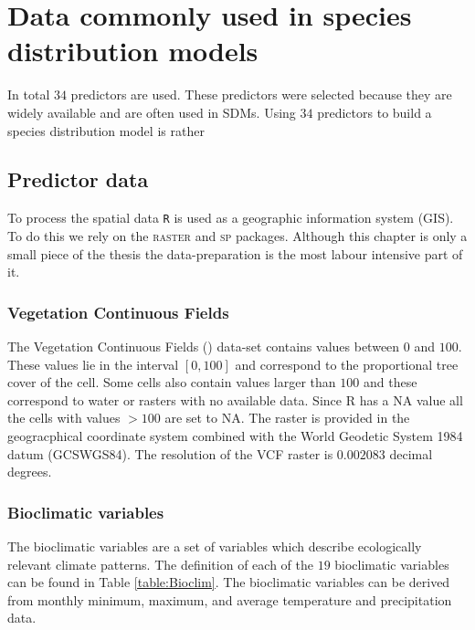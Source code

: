  \chapter{Data commonly used in species distribution models}
In total $34$ predictors are used. These predictors were selected because they are widely available and are often used in SDMs. Using $34$ predictors to build a species distribution model is rather 


\label{ch:DataCommonlyUsedInSpeciesDistributionModels}


\section{Predictor data}
To process the spatial data \texttt{R} is used as a geographic information system (GIS). To do this we rely on the \textsc{raster} \parencite{raster} and \textsc{sp} \parencite{sp} packages. Although this chapter is only a small piece of the thesis the data-preparation is the most labour intensive part of it. 


\subsection{Vegetation Continuous Fields}
The Vegetation Continuous Fields () data-set contains values between $0$ and $100$. These values lie in the interval $[0,100]$ and correspond to the proportional tree cover of the cell. Some cells also contain values larger than $100$ and these correspond to water or rasters with no available data. Since R has a \textsc{NA} value all the cells with values $> 100$ are set to \textsc{NA}. The raster is provided in the geogracphical coordinate system combined with the World Geodetic System 1984 datum (GCS\textunderscore WGS84). The resolution of the VCF raster is $0.002083$ decimal degrees.

\subsection{Bioclimatic variables}
The bioclimatic variables are a set of variables which describe ecologically relevant climate patterns.  The definition of each of the $19$ bioclimatic variables can be found in Table \ref{table:Bioclim}. The bioclimatic variables can be derived from monthly minimum, maximum, and average temperature and precipitation data.

